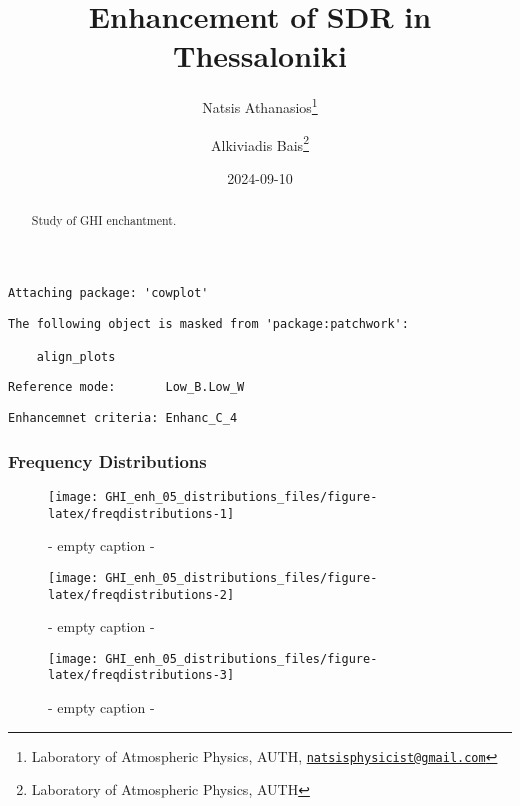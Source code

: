 \documentclass[
  10pt,
  a4paper,oneside]{article}
\title{Enhancement of SDR in Thessaloniki}
\author{Natsis Athanasios\footnote{Laboratory of Atmospheric Physics, AUTH, \href{mailto:natsisphysicist@gmail.com}{\nolinkurl{natsisphysicist@gmail.com}}} \and Alkiviadis Bais\footnote{Laboratory of Atmospheric Physics, AUTH}}
\date{2024-09-10}
\begin{document}
\maketitle
\begin{abstract}
Study of GHI enchantment.
\end{abstract}

{
\hypersetup{linkcolor=}
\setcounter{tocdepth}{4}
\tableofcontents
}
\begin{verbatim}
Attaching package: 'cowplot'
\end{verbatim}

\begin{verbatim}
The following object is masked from 'package:patchwork':

    align_plots
\end{verbatim}

\begin{verbatim}
Reference mode:       Low_B.Low_W 
\end{verbatim}

\begin{verbatim}
Enhancemnet criteria: Enhanc_C_4 
\end{verbatim}

\FloatBarrier

\hypertarget{frequency-distributions}{%
\subsubsection{Frequency Distributions}\label{frequency-distributions}}

\begin{figure}[H]

{\centering \texttt{[image: GHI\_enh\_05\_distributions\_files/figure-latex/freqdistributions-1]} 

}

\caption{ - empty caption - }\label{fig:freqdistributions-1}
\end{figure}
\begin{figure}[H]

{\centering \texttt{[image: GHI\_enh\_05\_distributions\_files/figure-latex/freqdistributions-2]} 

}

\caption{ - empty caption - }\label{fig:freqdistributions-2}
\end{figure}
\begin{figure}[H]

{\centering \texttt{[image: GHI\_enh\_05\_distributions\_files/figure-latex/freqdistributions-3]} 

}

\caption{ - empty caption - }\label{fig:freqdistributions-3}
\end{figure}
\end{document}
